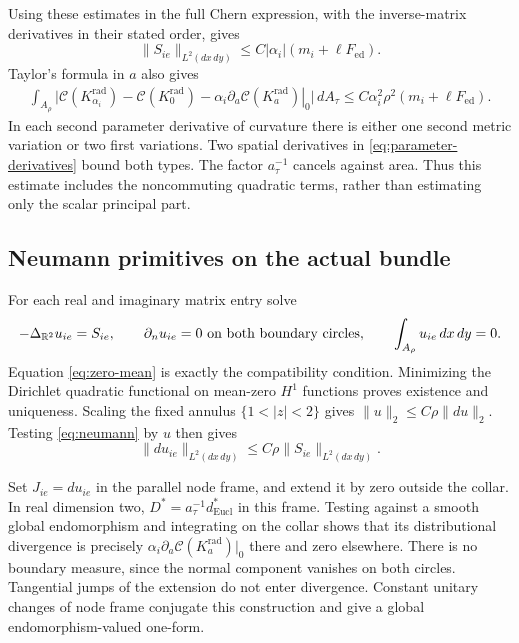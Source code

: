 Using these estimates in the full Chern expression, with the
inverse-matrix derivatives in their stated order, gives
\begin{equation}\label{eq:source-norm}
 \|S_{ie}\|_{L^2(dx\,dy)}
       \le C|\alpha_i|(m_i+\ell F_{\mathrm{ed}}).
\end{equation}
Taylor's formula in $a$ also gives
\begin{equation}\label{eq:nonlinear-collar-remainder}
 \begin{split}
 \int_{A_\rho}\bigl|\mathcal C(K_{\alpha_i}^{\mathrm{rad}})
       -\mathcal C(K_0^{\mathrm{rad}})
       -\alpha_i\left.\partial_a\mathcal C(K_a^{\mathrm{rad}})
                                      \right|_0\bigr|\,dA_\tau
 \le C\alpha_i^2\rho^2(m_i+\ell F_{\mathrm{ed}}).
 \end{split}
\end{equation}
In each second parameter derivative of curvature there is either
one second metric variation or two first variations. Two spatial
derivatives in \eqref{eq:parameter-derivatives} bound both types.
The factor $a_\tau^{-1}$ cancels against area. Thus this estimate
includes the noncommuting quadratic terms, rather than estimating
only the scalar principal part.

\subsection{Neumann primitives on the actual bundle}
For each real and imaginary matrix entry solve
\begin{equation}\label{eq:neumann}
 -\Delta_{\mathbb R^2}u_{ie}=S_{ie},\qquad
 \partial_nu_{ie}=0\ \text{on both boundary circles},\qquad
 \int_{A_\rho}u_{ie}\,dx\,dy=0.
\end{equation}
Equation \eqref{eq:zero-mean} is exactly the compatibility
condition. Minimizing the Dirichlet quadratic functional on
mean-zero $H^1$ functions proves existence and uniqueness.
Scaling the fixed annulus $\{1<|z|<2\}$ gives
$\|u\|_2\le C\rho\|du\|_2$. Testing \eqref{eq:neumann} by $u$
then gives
\begin{equation}\label{eq:neumann-energy}
 \|du_{ie}\|_{L^2(dx\,dy)}
                  \le C\rho\|S_{ie}\|_{L^2(dx\,dy)}.
\end{equation}

Set $J_{ie}=du_{ie}$ in the parallel node frame, and extend it
by zero outside the collar. In real dimension two,
$D^*=a_\tau^{-1}d_{\mathrm{Eucl}}^*$ in this frame. Testing
against a smooth global endomorphism and integrating on the
collar shows that its distributional divergence is precisely
$\alpha_i\partial_a\mathcal C(K_a^{\mathrm{rad}})|_0$ there
and zero elsewhere. There is no boundary measure, since the
normal component vanishes on both circles. Tangential jumps of
the extension do not enter divergence. Constant unitary changes
of node frame conjugate this construction and give a global
endomorphism-valued one-form.

